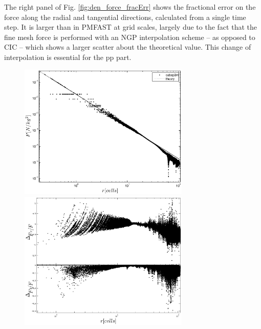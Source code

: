 The right panel of Fig. \ref{fig:den_force_fracErr} shows the fractional error on the force along the radial and tangential directions, calculated from a single time step.
It is larger than in {\small PMFAST} at grid scales, largely due to the fact that the fine mesh force is performed with an NGP interpolation scheme -- as opposed to CIC -- which shows a larger scatter about the theoretical value. 
This change of interpolation is essential for the pp part.

\begin{figure}%
  \begin{center}
    \includegraphics[width=3.2in]{graphs/densityForce_ppext=0.eps}
%
    \includegraphics[width=3.2in]{graphs/densityForce_fracErr.eps}

\end{center}
\end{figure}
